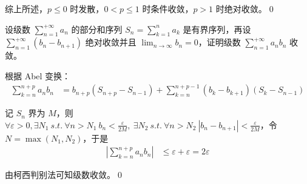 综上所述，$\displaystyle p\leqslant 0$ 时发散，$\displaystyle 0< p\leqslant 1$ 时条件收敛，$\displaystyle p >1$ 时绝对收敛。\qed 





\begin{ques}
	设级数 $\displaystyle \sum _{n=1}^{+\infty } a_{n}$ 的部分和序列 $\displaystyle S_{n} =\sum _{k=1}^{n} a_{k}$ 是有界序列，再设 $\displaystyle \sum _{n=1}^{+\infty }( b_{n} -b_{n+1})$ 绝对收敛并且 $\displaystyle \lim _{n\rightarrow \infty } b_{n} =0$，证明级数 $\displaystyle \sum _{n=1}^{+\infty } a_{n} b_{n}$ 收敛。
\end{ques}



根据 Abel 变换：
\begin{align*}
	\sum _{k=n}^{n+p} a_{n} b_{n} & =b_{n+p}( S_{n+p} -S_{n-1}) +\sum _{k=n}^{n+p-1}( b_{k} -b_{k+1})( S_{k} -S_{n-1})
\end{align*}

记 $\displaystyle S_{n}$ 界为 $\displaystyle M$，则 $\displaystyle \forall \varepsilon  >0,\exists N_{1} \ s.t.\ \forall n >N_{1} \ b_{n} < \frac{\varepsilon }{2M} ,\ \exists N_{2} \ s.t.\ \forall n >N_{2} \ |b_{n} -b_{n+1} |< \frac{\varepsilon }{2M}$，令 $\displaystyle N=\max( N_{1} ,N_{2})$，于是
\begin{align*}
	\left| \sum _{k=n}^{n+p} a_{n} b_{n}\right|  & \leqslant \varepsilon +\varepsilon =2\varepsilon 
\end{align*}

由柯西判别法可知级数收敛。\qed 
\ifx\allfiles\undefined

\fi